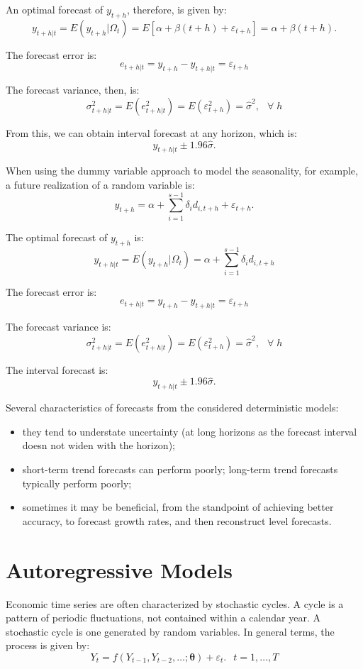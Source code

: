 \documentclass[
  12pt,
  oneside]{book}
\providecommand{\tightlist}{%
  \setlength{\itemsep}{0pt}\setlength{\parskip}{0pt}}
\begin{document}
An optimal forecast of \(y_{t+h}\), therefore, is given by: \[y_{t+h|t} = E(y_{t+h}|\Omega_t) = E[\alpha + \beta (t+h) + \varepsilon_{t+h}] = \alpha + \beta (t+h).\]

The forecast error is: \[e_{t+h|t} = y_{t+h} - y_{t+h|t} = \varepsilon_{t+h}\]

The forecast variance, then, is: \[\sigma_{t+h|t}^2 = E(e_{t+h|t}^2) =  E(\varepsilon_{t+h}^2) = \hat{\sigma}^2,\;~~\forall\;h\]

From this, we can obtain interval forecast at any horizon, which is: \[y_{t+h|t} \pm 1.96 \hat{\sigma}.\]

When using the dummy variable approach to model the seasonality, for example, a future realization of a random variable is: \[y_{t+h} = \alpha + \sum_{i=1}^{s-1}\delta_i d_{i,t+h} + \varepsilon_{t+h}.\]

The optimal forecast of \(y_{t+h}\) is: \[y_{t+h|t} = E(y_{t+h}|\Omega_t) = \alpha + \sum_{i=1}^{s-1}\delta_i d_{i,t+h}\]

The forecast error is: \[e_{t+h|t} = y_{t+h} - y_{t+h|t} = \varepsilon_{t+h}\]

The forecast variance is: \[\sigma_{t+h|t}^2 = E(e_{t+h|t}^2) =  E(\varepsilon_{t+h}^2) = \hat{\sigma}^2,\;~~\forall\;h\]

The interval forecast is: \[y_{t+h|t} \pm 1.96 \hat{\sigma}.\]

Several characteristics of forecasts from the considered deterministic models:

\begin{itemize}
\tightlist
\item
  they tend to understate uncertainty (at long horizons as the forecast interval doesn not widen with the horizon);
\item
  short-term trend forecasts can perform poorly; long-term trend forecasts typically perform poorly;
\item
  sometimes it may be beneficial, from the standpoint of achieving better accuracy, to forecast growth rates, and then reconstruct level forecasts.
\end{itemize}

\hypertarget{autoregressive-models}{%
\chapter{Autoregressive Models}\label{autoregressive-models}}

Economic time series are often characterized by stochastic cycles. A cycle is a pattern of periodic fluctuations, not contained within a calendar year. A stochastic cycle is one generated by random variables. In general terms, the process is given by:
\[Y_t = f(Y_{t-1},Y_{t-2},\ldots;\mathbf{\theta})+\varepsilon_t.\;~~t=1,\ldots,T\]
\end{document}
